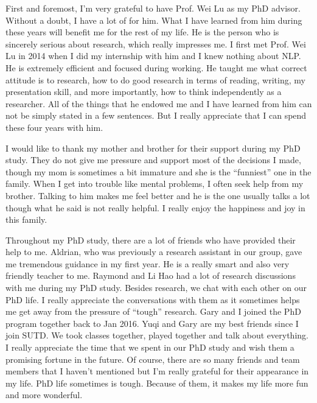 \documentclass[
11pt, %
oneside, %
english, %
singlespacing, %
headsepline, %
]{MastersDoctoralThesis} %
\begin{document}
\begin{acknowledgements}
\addchaptertocentry{\acknowledgementname} %

First and foremost, I'm very grateful to have Prof. Wei Lu as my PhD advisor. 
Without a doubt, I have a lot of for him.
What I have learned from him during these years will benefit me for the rest of my life.  
He is the person who is sincerely serious about research, which really impresses me.
I first met Prof. Wei Lu in 2014 when I did my internship with him and I knew nothing about NLP. 
He is extremely efficient and focused during working. 
He taught me what correct attitude is to research, how to do good research in terms of reading, writing, my presentation skill, and more importantly, how to think independently as a researcher. 
All of the things that he endowed me and I have learned from him can not be simply stated in a few sentences. 
But I really appreciate that I can spend these four years with him. 


I would like to thank my mother and brother for their support during my PhD study. 
They do not give me pressure and support most of the decisions I made, though my mom is sometimes a bit immature and she is the ``funniest'' one in the family.
When I get into trouble like mental problems, I often seek help from my brother.  
Talking to him makes me feel better and he is the one usually talks a lot though what he said is not really helpful. 
I really enjoy the happiness and joy in this family.

Throughout my PhD study, there are a lot of friends who have provided their help to me. 
Aldrian, who was previously a research assistant in our group, gave me tremendous guidance in my first year. 
He is a really smart and also very friendly teacher to me. 
Raymond and Li Hao had a lot of research discussions with me during my PhD study. 
Besides research, we chat with each other on our PhD life. 
I really appreciate the conversations with them as it sometimes helps me get away from the pressure of ``tough'' research.
Gary and I joined the PhD program together back to Jan 2016. 
Yuqi and Gary are my best friends since I join SUTD. 
We took classes together, played together and talk about everything. 
I really appreciate the time that we spent in our PhD study and wish them a promising fortune in the future. 
Of course, there are so many friends and team members that I haven't mentioned but I'm really grateful for their appearance in my life. 
PhD life sometimes is tough. 
Because of them, it makes my life more fun and more wonderful. 


\end{acknowledgements}
\end{document}
